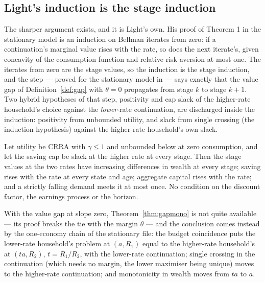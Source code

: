 \subsection{Light's induction is the stage induction}\label{sec:lightind}

The sharper argument exists, and it is Light's own. His proof of Theorem 1 in the stationary model
is an induction on Bellman iterates from zero: if a continuation's marginal value rises with the rate,
so does the next iterate's, given concavity of the consumption function and relative risk aversion at
most one. The iterates from zero are the stage values, so the induction is the stage induction, and
the step --- proved for the stationary model in  --- says
exactly that the value gap of Definition~\ref{def:gap} with $\theta=0$ propagates from stage $k$ to
stage $k+1$. Two hybrid hypotheses of that step, positivity and cap slack of the higher-rate
household's choice against the \emph{lower}-rate continuation, are discharged inside the induction:
positivity from unbounded utility, and slack from single crossing (the induction hypothesis) against
the higher-rate household's own slack.

\begin{theorem}\label{thm:lightind}
Let utility be CRRA with $\gamma\le1$ and unbounded below at zero consumption, and let the saving cap
be slack at the higher rate at every stage. Then the stage values at the two rates have increasing
differences in wealth at every stage; saving rises with the rate at every state and age; aggregate
capital rises with the rate; and a strictly falling demand meets it at most once. No condition on the
discount factor, the earnings process or the horizon.
\end{theorem}

With the value gap at slope zero, Theorem~\ref{thm:gapmono} is not quite available --- its proof
breaks the tie with the margin $\theta$ --- and the conclusion comes instead by the one-economy chain
of the stationary file: the budget coincidence puts the lower-rate household's problem at $(a,R_1)$
equal to the higher-rate household's at $(ta,R_2)$, $t=R_1/R_2$, with the lower-rate continuation;
single crossing in the continuation (which needs no margin, the lower maximiser being unique) moves
to the higher-rate continuation; and monotonicity in wealth moves from $ta$ to $a$.

